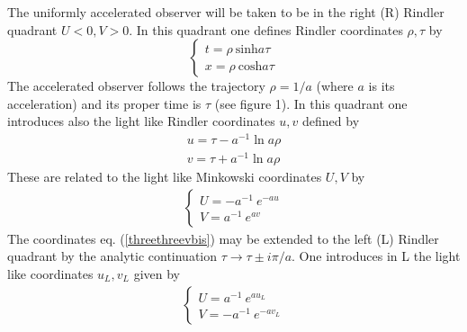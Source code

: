 \documentclass[12pt]{article}
\begin{document}
The uniformly accelerated observer
will be
taken to be in the right
(R) Rindler
quadrant $U<0,V>0$. In this quadrant one defines Rindler coordinates $\rho ,
\tau$ by
\begin{equation} \left \{ \begin{array}{ll} t=\rho\ \mbox{sinh} a\tau
\\ x=\rho\ \mbox{cosh} a\tau \end{array} \right. \label{threethreevbis}
\end{equation}
The accelerated observer follows the trajectory
$\rho = 1/a$ (where $a$ is its acceleration)
and its proper time is $\tau$
(see figure 1).
In this quadrant one introduces also the light like
Rindler coordinates $u,v$ defined by \begin{eqnarray}
u = \tau - a^{-1} \ln a\rho
\nonumber\\
 v= \tau + a^{-1} \ln a\rho
\end{eqnarray}
These are related to the light like Minkowski coordinates $U, V$ by
\begin{eqnarray}
\left \{ \begin{array}{ll}
U=-a^{-1}\ e^{-au} \\ V=a^{-1}\ e^{av} \end{array} \right.
\label{threethreevi} \end{eqnarray}
 The
coordinates eq. (\ref{threethreevbis})  may be extended to the left (L) Rindler
quadrant by the analytic continuation $\tau \rightarrow \tau \pm i \pi/a$. One
introduces in L the light like coordinates $u_L, v_L$ given by
\begin{eqnarray}
\left \{ \begin{array}{ll}
U=a^{-1}\ e^{au_L} \\ V=- a^{-1}\ e^{- a v_L}\end{array} \right.
\label{threethreeviL}
\end{eqnarray}
\end{document}
